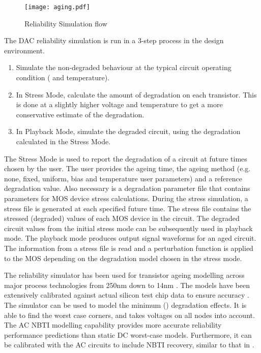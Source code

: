 \documentclass[11pt,a4paper]{article}
\begin{document}
\begin{figure}[tbp]
\centering
\texttt{[image: aging.pdf]}
\caption{Reliability Simulation flow}
\label{fig:aNicePicture}
\end{figure}







The DAC reliability simulation is run in a 3-step process in the design environment.

\begin{enumerate}
\item Simulate the non-degraded behaviour at the typical circuit operating condition ( and temperature).

\item In Stress Mode, calculate the amount of degradation on each transistor.  This is done at a slightly higher voltage and temperature to get a more conservative estimate of the degradation.  

\item In Playback Mode, simulate the degraded circuit, using the degradation calculated in the Stress Mode. \end{enumerate}

The Stress Mode is used to report the degradation of a circuit at future times chosen by the user. The user provides the ageing time, the ageing method  (e.g. none, fixed, uniform, bias and temperature user parameters) and a reference degradation value. Also necessary is a degradation parameter file that contains parameters for MOS device stress calculations. During the stress simulation, a stress file is generated at each specified future time. The stress file contains the stressed (degraded) values of each MOS device in the circuit. The degraded circuit values from the initial stress mode can be subsequently used in playback mode. The playback mode produces output signal waveforms for an aged circuit. The information from a stress file is read and a perturbation function is applied to the MOS depending on the degradation model chosen in the stress mode.

The reliability simulator has been used for transistor ageing modelling across major process technologies from 250nm down to 14nm  \cite{Arend}.  The models have been extensively calibrated against  actual silicon test chip data to ensure accuracy \cite{Arend}. The simulator 
can be used to model the minimum  () degradation effects. It is able to find the worst case corners,
and takes voltages on all nodes into account. The AC NBTI modelling capability provides more accurate reliability performance predictions than static DC worst-case models. Furthermore, it can be calibrated with the AC circuits to include NBTI recovery, similar to that in \cite{Kufluoglu}.
\end{document}
